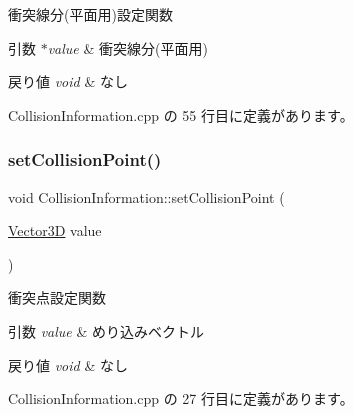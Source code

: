 衝突線分(平面用)設定関数 


\begin{DoxyParams}{引数}
{\em $\ast$value} & 衝突線分(平面用) \\
\hline
\end{DoxyParams}

\begin{DoxyRetVals}{戻り値}
{\em void} & なし \\
\hline
\end{DoxyRetVals}


 Collision\+Information.\+cpp の 55 行目に定義があります。

\mbox{\label{class_collision_information_a299c2d8462f26dbacabb71029ba6ce4f}} 
\subsubsection{\texorpdfstring{set\+Collision\+Point()}{setCollisionPoint()}}
{\footnotesize\ttfamily void Collision\+Information\+::set\+Collision\+Point (\begin{DoxyParamCaption}\item[{\mbox{\hyperlink{class_vector3_d}{Vector3D}}}]{value }\end{DoxyParamCaption})}



衝突点設定関数 


\begin{DoxyParams}{引数}
{\em value} & めり込みベクトル \\
\hline
\end{DoxyParams}

\begin{DoxyRetVals}{戻り値}
{\em void} & なし \\
\hline
\end{DoxyRetVals}


 Collision\+Information.\+cpp の 27 行目に定義があります。

\mbox{\label{class_collision_information_ae4de2bbe47ac7de5587b27552cff995f}} 
